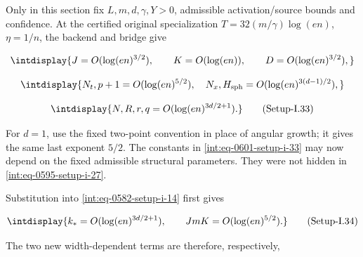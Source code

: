 
Only in this section fix \(L,\allowbreak m,\allowbreak d,\allowbreak \gamma,\allowbreak Y>0\), admissible activation/source bounds and confidence. At the certified original specialization \(T=32(m/\gamma)\log(en)\), \(\eta=1/n\), the backend and bridge give


\begingroup\renewcommand{\theHequation}{intdisplay.1118}
\begin{equation*}
\intdisplay{
J=O(\log(en)^{3/2}),\qquad K=O(\log(en)),\qquad
D=O(\log(en)^{3/2}),
}
\end{equation*}
\endgroup

\begingroup\renewcommand{\theHequation}{intdisplay.1119}
\begin{equation*}
\intdisplay{
N_t,p+1=O(\log(en)^{5/2}),\quad
N_x,H_{\rm sph}=O(\log(en)^{3(d-1)/2}),
}
\end{equation*}
\endgroup

\label{int:eq-setup-i-33}
\begingroup\renewcommand{\theHequation}{intdisplay.1120}
\begin{equation}
\intdisplay{
N,R,r,q=O(\log(en)^{3d/2+1}).
}
\tag{Setup-I.33}
\label{int:eq-0601-setup-i-33}
\end{equation}
\endgroup


For \(d=1\), use the fixed two-point convention in place of angular growth; it gives the same last exponent \(5/2\). The constants in \hyperref[int:eq-setup-i-33]{\eqref{int:eq-0601-setup-i-33}} may now depend on the fixed admissible structural parameters. They were not hidden in \hyperref[int:eq-setup-i-27]{\eqref{int:eq-0595-setup-i-27}}.



Substitution into \hyperref[int:eq-setup-i-14]{\eqref{int:eq-0582-setup-i-14}} first gives


\label{int:eq-setup-i-34}
\begingroup\renewcommand{\theHequation}{intdisplay.1121}
\begin{equation}
\intdisplay{
k_*=O(\log(en)^{3d/2+1}),\qquad JmK=O(\log(en)^{5/2}).
}
\tag{Setup-I.34}
\label{int:eq-0602-setup-i-34}
\end{equation}
\endgroup


The two new width-dependent terms are therefore, respectively,


